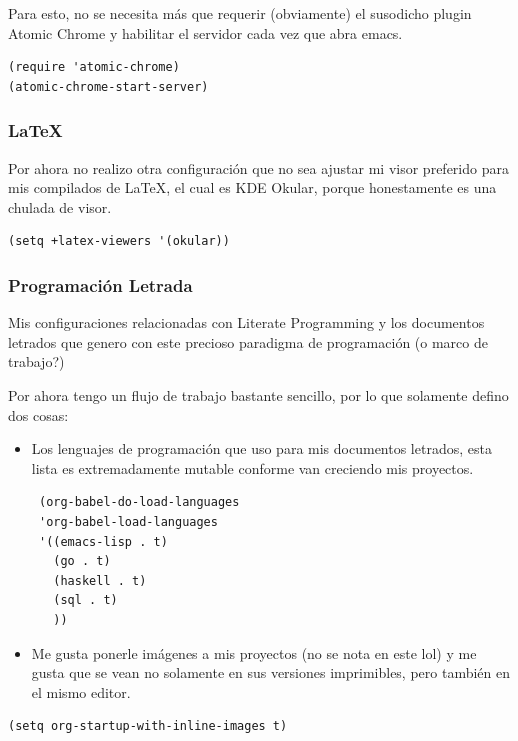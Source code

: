 \documentclass[11pt]{article}
\begin{document}
Para esto, no se necesita más que requerir (obviamente) el susodicho plugin Atomic Chrome y habilitar el servidor cada vez que abra emacs.

\begin{verbatim}
(require 'atomic-chrome)
(atomic-chrome-start-server)
\end{verbatim}
\subsubsection{\LaTeX{}}
\label{sec:org4e3b151}

Por ahora no realizo otra configuración que no sea ajustar mi visor preferido para mis compilados de \LaTeX{}, el cual es KDE Okular, porque honestamente es una chulada de visor.

\begin{verbatim}
(setq +latex-viewers '(okular))
\end{verbatim}
\subsubsection{Programación Letrada}
\label{sec:orgd30ba20}

Mis configuraciones relacionadas con Literate Programming y los documentos letrados que genero con este precioso paradigma de programación (o marco de trabajo?)

Por ahora tengo un flujo de trabajo bastante sencillo, por lo que solamente defino dos cosas:

\begin{itemize}
\item Los lenguajes de programación que uso para mis documentos letrados, esta lista es extremadamente mutable conforme van creciendo mis proyectos.

\begin{verbatim}
 (org-babel-do-load-languages
 'org-babel-load-languages
 '((emacs-lisp . t)
   (go . t)
   (haskell . t)
   (sql . t)
   ))
\end{verbatim}

\item Me gusta ponerle imágenes a mis proyectos (no se nota en este lol) y me gusta que se vean no solamente en sus versiones imprimibles, pero también en el mismo editor.
\end{itemize}

\begin{verbatim}
(setq org-startup-with-inline-images t)
\end{verbatim}
\end{document}
